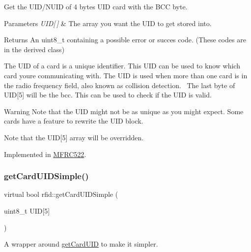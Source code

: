 Get the U\+I\+D/\+N\+U\+ID of 4 bytes U\+ID card with the B\+CC byte. 


\begin{DoxyParams}{Parameters}
{\em U\+I\+D\mbox{[}$\,$\mbox{]}} & The array you want the U\+ID to get stored into. \\
\hline
\end{DoxyParams}
\begin{DoxyReturn}{Returns}
An uint8\+\_\+t containing a possible error or succes code. (These codes are in the derived class)
\end{DoxyReturn}
The U\+ID of a card is a unique identifier. This U\+ID can be used to know which card you\textquotesingle{}re communicating with. The U\+ID is used when more than one card is in the radio frequency field, also known as collision detection.~\newline
 The last byte of U\+ID\mbox{[}5\mbox{]} will be the bcc. This can be used to check if the U\+ID is valid. \begin{DoxyWarning}{Warning}
Note that the U\+ID might not be as unique as you might expect. Some cards have a feature to rewrite the U\+ID block. 

Note that the U\+ID\mbox{[}5\mbox{]} array will be overridden. 
\end{DoxyWarning}


Implemented in \mbox{\hyperlink{class_m_f_r_c522_ad3c7ab4c70988e80c400f36f724a12b7}{M\+F\+R\+C522}}.

\mbox{\label{classrfid_aaeb826495120d8d29683f0ea1b985d77}} 
\subsubsection{\texorpdfstring{get\+Card\+U\+I\+D\+Simple()}{getCardUIDSimple()}}
{\footnotesize\ttfamily virtual bool rfid\+::get\+Card\+U\+I\+D\+Simple (\begin{DoxyParamCaption}\item[{uint8\+\_\+t}]{U\+ID\mbox{[}5\mbox{]} }\end{DoxyParamCaption})\hspace{0.3cm}{\ttfamily [pure virtual]}}



A wrapper around \mbox{\hyperlink{classrfid_afeb2a321694ceaf84db793f5efb3a750}{get\+Card\+U\+ID}} to make it simpler. 


